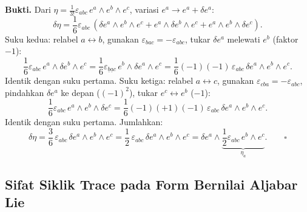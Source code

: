 \bigskip\noindent\textbf{Bukti.} Dari $\eta = \frac{1}{3!}\varepsilon_{abc}\,e^a \wedge e^b \wedge e^c$, variasi $e^a \to e^a + \delta e^a$:
\begin{equation}
    \delta\eta = \frac{1}{6}\varepsilon_{abc}\,(\delta e^a \wedge e^b \wedge e^c + e^a \wedge \delta e^b \wedge e^c + e^a \wedge e^b \wedge \delta e^c).
\end{equation}
Suku kedua: relabel $a \leftrightarrow b$, gunakan $\varepsilon_{bac} = -\varepsilon_{abc}$, tukar $\delta e^a$ melewati $e^b$ (faktor $-1$):
\begin{equation}
    \frac{1}{6}\varepsilon_{abc}\,e^a \wedge \delta e^b \wedge e^c = \frac{1}{6}\varepsilon_{\underline{b}\underline{a}c}\,e^b \wedge \delta e^a \wedge e^c = \frac{1}{6}(-1)(-1)\,\varepsilon_{abc}\,\delta e^a \wedge e^b \wedge e^c.
\end{equation}
Identik dengan suku pertama. Suku ketiga: relabel $a \leftrightarrow c$, gunakan $\varepsilon_{cba} = -\varepsilon_{abc}$, pindahkan $\delta e^a$ ke depan ($(-1)^2$), tukar $e^c \leftrightarrow e^b$ ($-1$):
\begin{equation}
    \frac{1}{6}\varepsilon_{abc}\,e^a \wedge e^b \wedge \delta e^c = \frac{1}{6}(-1)(+1)(-1)\,\varepsilon_{abc}\,\delta e^a \wedge e^b \wedge e^c.
\end{equation}
Identik dengan suku pertama. Jumlahkan:
\begin{equation}
    \delta\eta = \frac{3}{6}\,\varepsilon_{abc}\,\delta e^a \wedge e^b \wedge e^c = \frac{1}{2}\,\varepsilon_{abc}\,\delta e^a \wedge e^b \wedge e^c = \delta e^a \wedge \underbrace{\frac{1}{2}\varepsilon_{abc}\,e^b \wedge e^c}_{\eta_a}. \qquad\square
\end{equation}

\subsection{Sifat Siklik Trace pada Form Bernilai Aljabar Lie}
\label{app:proof-cyclic-trace}
 
